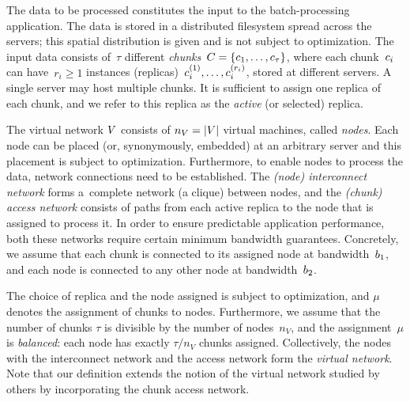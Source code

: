  The data to be processed constitutes the input to the batch-processing application.
The data is stored in a distributed filesystem spread across the servers; this spatial distribution is given and is not subject to optimization.
The input data consists of~$\tau$ different \emph{chunks}~${C = \{ c_1, \ldots, c_{\tau} \}}$,
where each chunk~$c_i$ can have~$r_i\geq 1$ instances (replicas)~$c_{i}^{(1)},\ldots, c_{i}^{(r_i)}$,
 stored at different servers. A single server may host multiple chunks.
It is sufficient to assign one replica of each chunk, and we refer to this
replica as the \emph{active} (or selected) replica.

 The virtual network $V$ consists of $n_V=|V|$ virtual machines, called \emph{nodes}.
Each node can be placed (or, synonymously, embedded) at an arbitrary server and this placement is subject
to optimization.
Furthermore, to enable nodes to process the data, network connections need to be established.
The \emph{(node) interconnect network} forms a~complete network (a clique) between nodes,
and the \emph{(chunk) access network} consists of paths from each active replica to the node that is assigned to process it.
In order to ensure predictable application performance, both these networks require certain minimum bandwidth guarantees.
Concretely, we assume that each chunk
is connected to its assigned node at bandwidth~$b_1$, and each node is connected to any other node
at  bandwidth~$b_2$.

The choice of replica and the node assigned is subject to optimization, and
$\mu$ denotes the assignment of chunks to nodes.
Furthermore, we assume that the number of chunks $\tau$ is divisible by the number of nodes~$n_V$, and the assignment~$\mu$ is \emph{balanced}:
each node has exactly $\tau / n_V$ chunks assigned.
Collectively, the nodes with the interconnect network and the access network form the \emph{virtual network}.
Note that our definition extends the notion of the virtual network studied by others \cite{oktopus,MogPop12,infocom16,ccr15emb,proteus} by incorporating the chunk access network.


